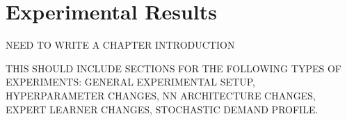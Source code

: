 \chapter{Experimental Results}

NEED TO WRITE A CHAPTER INTRODUCTION

THIS SHOULD INCLUDE SECTIONS FOR THE FOLLOWING TYPES OF EXPERIMENTS: GENERAL EXPERIMENTAL SETUP, HYPERPARAMETER CHANGES, NN ARCHITECTURE CHANGES, EXPERT LEARNER CHANGES, STOCHASTIC DEMAND PROFILE.














